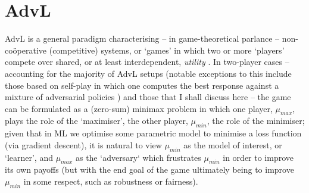 \section{\Acl{AdvL}}\label{sec:advl}
\acf{AdvL} is a general paradigm characterising -- in game-theoretical parlance --
non-co{\"o}perative (competitive) systems, or `games' in which two or more `players' compete over
shared, or at least interdependent, \emph{utility} \citep{fudenberg1991game}.
%
%
In two-player cases -- accounting for the majority of \ac{AdvL} setups (notable exceptions to this
include those based on self-play in which one computes the best response against a mixture of
adversarial policies \citep{silver2017mastering, vinyals2019grandmaster}) and those that I shall
discuss here -- the game can be formulated as a (zero-sum) minimax problem in which one player,
\(\mu_{max}\), plays the role of the `maximiser', the other player, \(\mu_{min}\), the role of the
minimiser; given that in \ac{ML} we optimise some parametric model to minimise a loss function (via
gradient descent), it is natural to view \(\mu_{min}\) as the model of interest, or `learner', and
\(\mu_{max}\) as the `adversary` which frustrates \(\mu_{min}\) in order to improve its own payoffs
(but with the end goal of the game ultimately being to improve \(\mu_{min}\) in some respect, such
as robustness or fairness).
%

